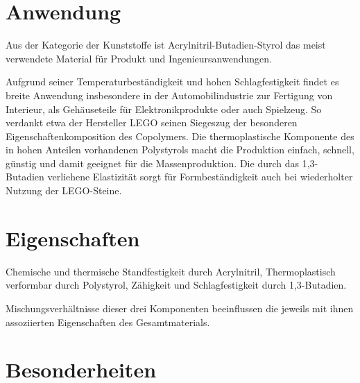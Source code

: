 \section{Anwendung}
        Aus der Kategorie der Kunststoffe ist Acrylnitril-Butadien-Styrol das meist verwendete Material für Produkt und
        Ingenieursanwendungen.\par
        Aufgrund seiner Temperaturbeständigkeit und hohen Schlagfestigkeit findet es breite Anwendung insbesondere in der
        Automobilindustrie zur Fertigung von Interieur, als Gehäuseteile für Elektronikprodukte oder auch Spielzeug. So verdankt etwa der Hersteller
        \textsc{LEGO} seinen Siegeszug der besonderen Eigenschaftenkomposition des Copolymers. Die thermoplastische Komponente
        des in hohen Anteilen vorhandenen Polystyrols macht die Produktion einfach, schnell, günstig und damit geeignet
        für die Massenproduktion. Die durch das 1,3-Butadien verliehene Elastizität sorgt für Formbeständigkeit auch bei
        wiederholter Nutzung der \textsc{LEGO}-Steine.
\section{Eigenschaften}
        Chemische und thermische Standfestigkeit durch Acrylnitril, Thermoplastisch verformbar durch Polystyrol, Zähigkeit
        und Schlagfestigkeit durch 1,3-Butadien.\par
        Mischungsverhältnisse dieser drei Komponenten beeinflussen die jeweils mit ihnen assoziierten Eigenschaften des
        Gesamtmaterials.
\section{Besonderheiten}